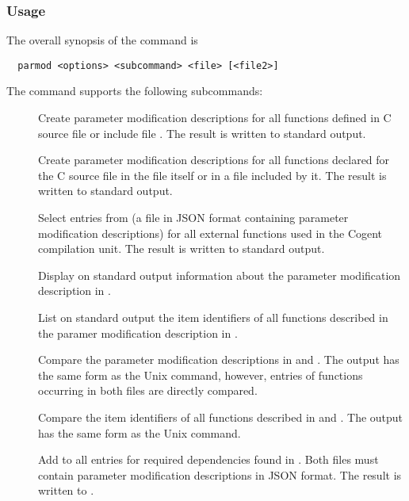\subsubsection{Usage}

The overall synopsis of the  command is
\begin{verbatim}
  parmod <options> <subcommand> <file> [<file2>]
\end{verbatim}

The  command supports the following subcommands:
\begin{description}
\item[] Create parameter modification descriptions for all functions defined in C source file 
or include file .
The result is written to standard output.

\item[] Create parameter modification descriptions for all functions declared for the C source file
 in the file itself or in a file included by it.
The result is written to standard output.

\item[] Select entries from  (a file in JSON format containing parameter modification
descriptions) for all external functions used in the Cogent compilation unit. 
The result is written to standard output.

\item[] Display on standard output information about the parameter modification description in .

\item[] List on standard output the item identifiers of all functions described in the 
paramer modification description in .

\item[] Compare the parameter modification descriptions in  and . The output
has the same form as the Unix  command, however, entries of functions occurring in both files are 
directly compared.

\item[] Compare the item identifiers of all functions described in  and .
The output has the same form as the Unix  command.

\item[] Add to  all entries for required dependencies found in . Both files must contain 
parameter modification descriptions in JSON format. The result is written to .


\end{description}
